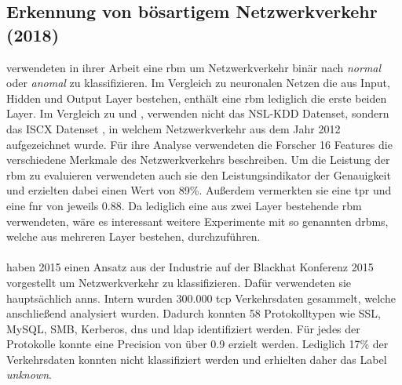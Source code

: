 \documentclass[
    12pt, %
    DIV10,
    ngerman, %
    a4paper, %
    oneside, %
    titlepage, %
    parskip=half, %
    headings=normal, %
    listof=totoc, %
    bibliography=totoc, %
    index=totoc, %
    captions=tableheading, %
    final %
]{scrreprt}
\begin{document}
\subsection{Erkennung von bösartigem Netzwerkverkehr (2018)}\label{iscx1}
\textcite{Aldwairi2018} verwendeten in ihrer Arbeit eine \ac{rbm} um Netzwerkverkehr binär nach \emph{normal} oder \emph{anomal} zu klassifizieren. Im Vergleich zu neuronalen Netzen die aus Input, Hidden und Output Layer bestehen, enthält eine \ac{rbm} lediglich die erste beiden Layer. Im Vergleich zu \textcite{Yin2017} und \textcite{Ding2018}, verwenden \textcite{Aldwairi2018} nicht das NSL-KDD Datenset, sondern das ISCX Datenset \parencite{shiravi2012toward}, in welchem Netzwerkverkehr aus dem Jahr 2012 aufgezeichnet wurde. Für ihre Analyse verwendeten die Forscher 16 Features die verschiedene Merkmale des Netzwerkverkehrs beschreiben. Um die Leistung der \ac{rbm} zu evaluieren verwendeten auch sie den Leistungsindikator der Genauigkeit und erzielten dabei einen Wert von 89\%. Au{\ss}erdem vermerkten sie eine \ac{tpr} und eine \ac{fnr} von jeweils 0.88. Da \textcite{Aldwairi2018} lediglich eine aus zwei Layer bestehende \ac{rbm} verwendeten, wäre es interessant weitere Experimente mit so genannten \ac{drbms}, welche aus mehreren Layer bestehen, durchzuführen.
\\\\
\textcite{Wang2015} haben 2015 einen Ansatz aus der Industrie auf der Blackhat Konferenz 2015 vorgestellt um Netzwerkverkehr zu klassifizieren. Dafür verwendeten sie hauptsächlich \ac{anns}. Intern wurden 300.000 \ac{tcp} Verkehrsdaten gesammelt, welche anschlie{\ss}end analysiert wurden. Dadurch konnten 58 Protokolltypen wie SSL, MySQL, SMB, Kerberos, \ac{dns} und \ac{ldap} identifiziert werden. Für jedes der Protokolle konnte eine Precision von über 0.9 erzielt werden. Lediglich 17\% der Verkehrsdaten konnten nicht klassifiziert werden und erhielten daher das Label \emph{unknown}.

%
\end{document}
